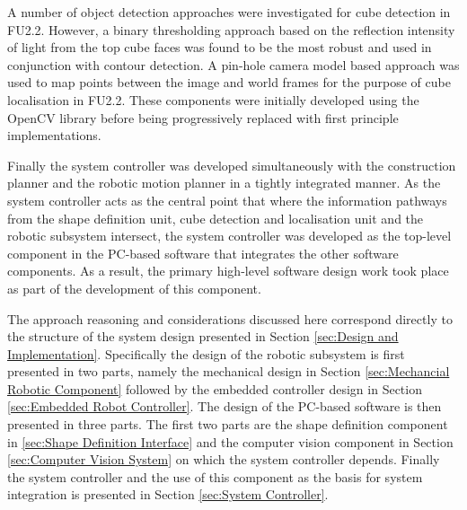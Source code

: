 A number of object detection approaches were investigated for cube detection in FU2.2. However, a binary thresholding approach based on the reflection intensity of light from the top cube faces was found to be the most robust and used in conjunction with contour detection. A pin-hole camera model based approach was used to map points between the image and world frames for the purpose of cube localisation in FU2.2. These components were initially developed using the OpenCV library before being progressively replaced with first principle implementations.

Finally the system controller was developed simultaneously with the construction planner and the robotic motion planner in a tightly integrated manner. As the system controller acts as the central point that where the information pathways from the shape definition unit, cube detection and localisation unit and the robotic subsystem intersect, the system controller was developed as the top-level component in the PC-based software that integrates the other software components. As a result, the primary high-level software design work took place as part of the development of this component.

The approach reasoning and considerations discussed here correspond directly to the structure of the system design presented in Section \ref{sec:Design and Implementation}. Specifically the design of the robotic subsystem is first presented in two parts, namely the mechanical design in Section \ref{sec:Mechancial Robotic Component} followed by the embedded controller design in Section \ref{sec:Embedded Robot Controller}. The design of the PC-based software is then presented in three parts. The first two parts are the shape definition component in \ref{sec:Shape Definition Interface} and the computer vision component in Section \ref{sec:Computer Vision System} on which the system controller depends. Finally the system controller and the use of this component as the basis for system integration is presented in Section \ref{sec:System Controller}.


\newpage


